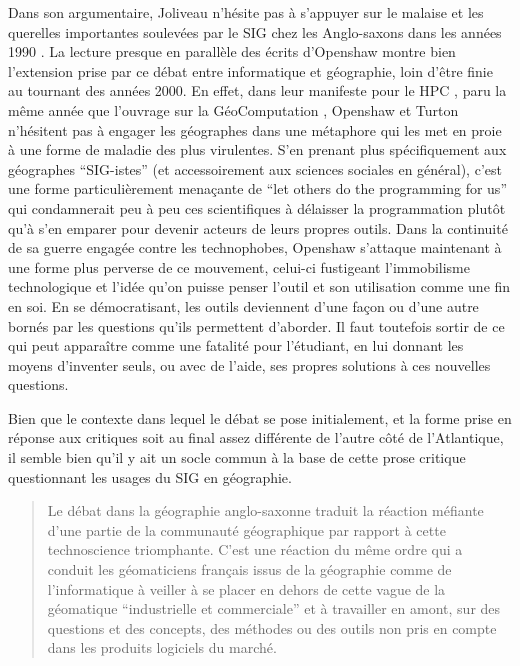 Dans son argumentaire, Joliveau n'hésite pas à s'appuyer sur le malaise et les querelles importantes soulevées par le SIG chez les Anglo-saxons dans les années 1990 \autocite[472-473]{Joliveau2004}. La lecture presque en parallèle des écrits d'Openshaw montre bien l'extension prise par ce débat entre informatique et géographie, loin d'être finie au tournant des années 2000. En effet, dans leur manifeste pour le HPC \autocite[2]{Openshaw2000}, paru la même année que l'ouvrage sur la GéoComputation \autocite{Openshaw2000b},  Openshaw et Turton n’hésitent pas à engager les géographes dans une métaphore qui les met en proie à une forme de maladie des plus virulentes. S'en prenant plus spécifiquement aux géographes \enquote{SIG-istes} (et accessoirement aux sciences sociales en général), c’est une forme particulièrement menaçante de \foreignquote{english}{let others do the programming for us} qui condamnerait peu à peu ces scientifiques à délaisser la programmation plutôt qu’à s’en emparer pour devenir acteurs de leurs propres outils. Dans la continuité de sa guerre engagée contre les technophobes, Openshaw s'attaque  maintenant à une forme plus perverse de ce mouvement, celui-ci fustigeant l'immobilisme technologique et l'idée qu'on puisse penser l'outil et son utilisation comme une fin en soi. En se démocratisant, les outils deviennent d'une façon ou d'une autre bornés par les questions qu'ils permettent d'aborder. Il faut toutefois sortir de ce qui peut apparaître comme une fatalité pour l'étudiant, en lui donnant les moyens d'inventer seuls, ou avec de l'aide, ses propres solutions à ces nouvelles questions.

Bien que le contexte dans lequel le débat se pose initialement, et la forme prise en réponse aux critiques soit au final assez différente de l'autre côté de l'Atlantique, il semble bien qu'il y ait un socle commun à la base de cette prose critique questionnant les usages du SIG en géographie.

\blockquote[{\cite[474]{Joliveau2004}}]{Le débat dans la géographie anglo-saxonne traduit la réaction méfiante d'une partie de la communauté géographique par rapport à cette technoscience triomphante. C'est une réaction du même ordre qui a conduit les géomaticiens français issus de la géographie comme de l'informatique à veiller à se placer en dehors de cette vague de la géomatique \enquote{industrielle et commerciale} et à travailler en amont, sur des questions et des concepts, des méthodes ou des outils non pris en compte dans les produits logiciels du marché.}

